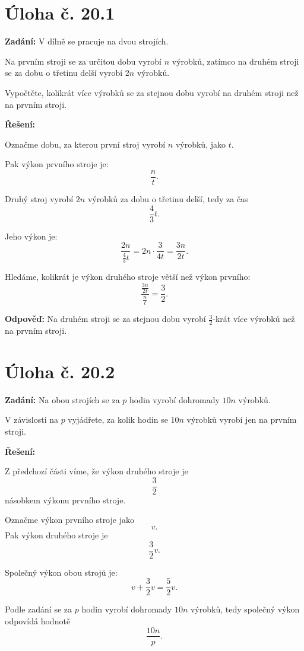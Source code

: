 \documentclass[12pt,a4paper]{article}
\begin{document}
\section*{Úloha č. 20.1}

\textbf{Zadání:}  
V dílně se pracuje na dvou strojích.

Na prvním stroji se za určitou dobu vyrobí \(n\) výrobků, zatímco na druhém stroji se za dobu o třetinu delší vyrobí \(2n\) výrobků.

Vypočtěte, kolikrát více výrobků se za stejnou dobu vyrobí na druhém stroji než na prvním stroji.

\bigskip

\textbf{Řešení:}

Označme dobu, za kterou první stroj vyrobí \(n\) výrobků, jako \(t\).

Pak výkon prvního stroje je:
\[
\frac{n}{t}.
\]

Druhý stroj vyrobí \(2n\) výrobků za dobu o třetinu delší, tedy za čas
\[
\frac{4}{3}t.
\]

Jeho výkon je:
\[
\frac{2n}{\frac{4}{3}t}=2n\cdot\frac{3}{4t}=\frac{3n}{2t}.
\]

Hledáme, kolikrát je výkon druhého stroje větší než výkon prvního:
\[
\frac{\frac{3n}{2t}}{\frac{n}{t}}=\frac{3}{2}.
\]

\bigskip

\textbf{Odpověď:}  
Na druhém stroji se za stejnou dobu vyrobí \(\frac{3}{2}\)-krát více výrobků než na prvním stroji.


\section*{Úloha č. 20.2}

\textbf{Zadání:}  
Na obou strojích se za \(p\) hodin vyrobí dohromady \(10n\) výrobků.

V závislosti na \(p\) vyjádřete, za kolik hodin se \(10n\) výrobků vyrobí jen na prvním stroji.

\bigskip

\textbf{Řešení:}

Z předchozí části víme, že výkon druhého stroje je
\[
\frac32
\]
násobkem výkonu prvního stroje.

Označme výkon prvního stroje jako
\[
v.
\]
Pak výkon druhého stroje je
\[
\frac32v.
\]

Společný výkon obou strojů je:
\[
v+\frac32v=\frac52v.
\]

Podle zadání se za \(p\) hodin vyrobí dohromady \(10n\) výrobků, tedy společný výkon odpovídá hodnotě
\[
\frac{10n}{p}.
\]
\end{document}

